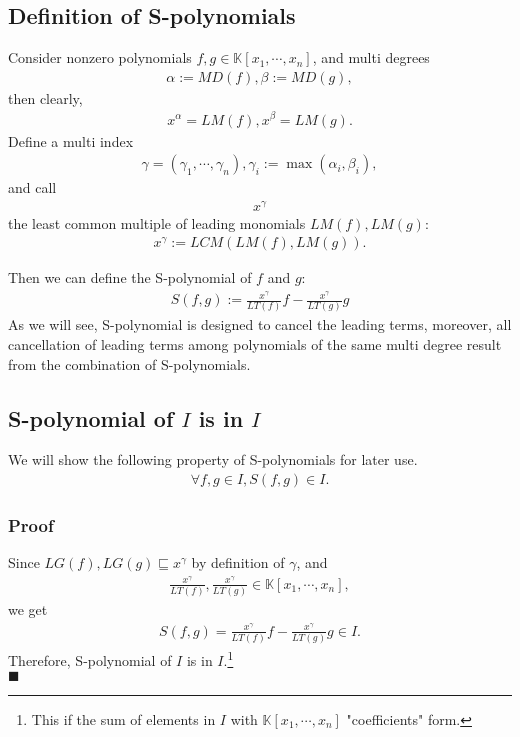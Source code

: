 \documentclass[11pt]{book}
\begin{document}
\subsection{Definition of S-polynomials}
Consider nonzero polynomials $f,g \in \mathbb{K}[x_1, \cdots, x_n]$, and multi degrees
\begin{eqnarray}
\alpha := MD(f), \beta := MD(g),
\end{eqnarray}
then clearly,
\begin{eqnarray}
x^\alpha = LM(f), x^\beta = LM(g).
\end{eqnarray}
Define a multi index
\begin{eqnarray}
\gamma = (\gamma_1, \cdots, \gamma_n), \gamma_i := \max(\alpha_i, \beta_i),
\end{eqnarray}
and call
\begin{eqnarray}
x^\gamma 
\end{eqnarray}
the least common multiple of leading monomials $LM(f), LM(g)$:
\begin{eqnarray}
x^\gamma := LCM\left( LM(f), LM(g) \right).
\end{eqnarray}

Then we can define the S-polynomial of $f$ and $g$:
\begin{eqnarray}
S(f,g) := \frac{x^\gamma}{LT(f)} f - \frac{x^\gamma}{LT(g)} g 
\end{eqnarray}
As we will see, S-polynomial is designed to cancel the leading terms, moreover, all cancellation of leading terms among polynomials of the same multi degree result from the combination of S-polynomials.

\subsection{S-polynomial of $I$ is in $I$}
\label{SofIisInI}
We will show the following property of S-polynomials for later use.
\begin{eqnarray}
\forall f,g \in I, S(f,g)\in I.
\end{eqnarray}

\subsubsection{Proof}
Since $LG(f), LG(g) \sqsubseteq x^\gamma$ by definition of $\gamma$, and
\begin{eqnarray}
\frac{x^\gamma}{LT(f)}, \frac{x^\gamma}{LT(g)} \in \mathbb{K}[x_1, \cdots, x_n],
\end{eqnarray}
we get
\begin{eqnarray}
S(f, g) = \frac{x^\gamma}{LT(f)} f - \frac{x^\gamma}{LT(g)} g \in I.
\end{eqnarray}
Therefore, S-polynomial of $I$ is in $I$.\footnote{This if the sum of elements in $I$ with $\mathbb{K}[x_1, \cdots, x_n]$ "coefficients" form.}\\
$\blacksquare$
\end{document}
